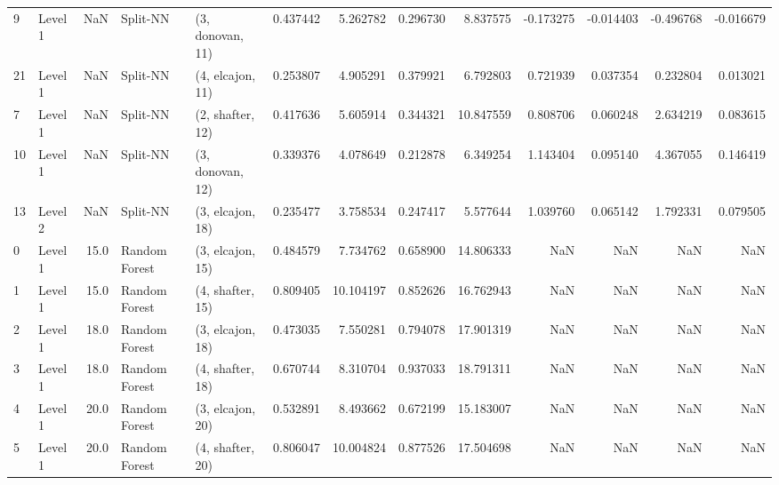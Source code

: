 \begin{tabular}{llrllrrrrrrrr}
9  &   Level 1 &    NaN &       Split-NN &  (3, donovan, 11) &   0.437442 &   5.262782 &  0.296730 &   8.837575 &            -0.173275 &              -0.014403 &           -0.496768 &             -0.016679 \\
21 &   Level 1 &    NaN &       Split-NN &  (4, elcajon, 11) &   0.253807 &   4.905291 &  0.379921 &   6.792803 &             0.721939 &               0.037354 &            0.232804 &              0.013021 \\
7  &   Level 1 &    NaN &       Split-NN &  (2, shafter, 12) &   0.417636 &   5.605914 &  0.344321 &  10.847559 &             0.808706 &               0.060248 &            2.634219 &              0.083615 \\
10 &   Level 1 &    NaN &       Split-NN &  (3, donovan, 12) &   0.339376 &   4.078649 &  0.212878 &   6.349254 &             1.143404 &               0.095140 &            4.367055 &              0.146419 \\
13 &   Level 2 &    NaN &       Split-NN &  (3, elcajon, 18) &   0.235477 &   3.758534 &  0.247417 &   5.577644 &             1.039760 &               0.065142 &            1.792331 &              0.079505 \\
0  &   Level 1 &   15.0 &  Random Forest &  (3, elcajon, 15) &   0.484579 &   7.734762 &  0.658900 &  14.806333 &                  NaN &                    NaN &                 NaN &                   NaN \\
1  &   Level 1 &   15.0 &  Random Forest &  (4, shafter, 15) &   0.809405 &  10.104197 &  0.852626 &  16.762943 &                  NaN &                    NaN &                 NaN &                   NaN \\
2  &   Level 1 &   18.0 &  Random Forest &  (3, elcajon, 18) &   0.473035 &   7.550281 &  0.794078 &  17.901319 &                  NaN &                    NaN &                 NaN &                   NaN \\
3  &   Level 1 &   18.0 &  Random Forest &  (4, shafter, 18) &   0.670744 &   8.310704 &  0.937033 &  18.791311 &                  NaN &                    NaN &                 NaN &                   NaN \\
4  &   Level 1 &   20.0 &  Random Forest &  (3, elcajon, 20) &   0.532891 &   8.493662 &  0.672199 &  15.183007 &                  NaN &                    NaN &                 NaN &                   NaN \\
5  &   Level 1 &   20.0 &  Random Forest &  (4, shafter, 20) &   0.806047 &  10.004824 &  0.877526 &  17.504698 &                  NaN &                    NaN &                 NaN &                   NaN \\

\end{tabular}
